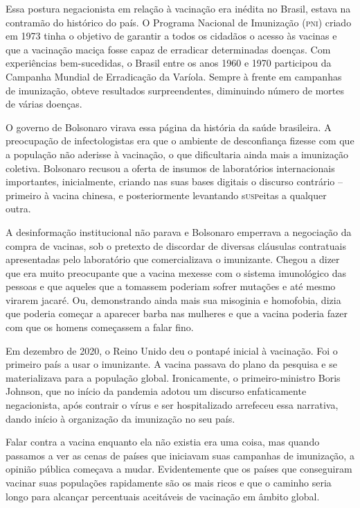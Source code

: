 Essa postura negacionista em relação à vacinação era inédita no Brasil,
estava na contramão do histórico do país. O Programa Nacional de
Imunização (\textsc{pni}) criado em 1973 tinha o objetivo de garantir a todos os
cidadãos o acesso às vacinas e que a vacinação maciça fosse capaz de
erradicar determinadas doenças. Com experiências bem-sucedidas, o Brasil
entre os anos 1960 e 1970 participou da Campanha Mundial de Erradicação
da Varíola. Sempre à frente em campanhas de imunização, obteve
resultados surpreendentes, diminuindo número de mortes de várias
doenças.

O governo de Bolsonaro virava essa página da história da saúde
brasileira. A preocupação de infectologistas era que o ambiente de
desconfiança fizesse com que a população não aderisse à vacinação, o que
dificultaria ainda mais a imunização coletiva. Bolsonaro recusou a
oferta de insumos de laboratórios internacionais importantes,
inicialmente, criando nas suas bases digitais o discurso contrário --
primeiro à vacina chinesa, e posteriormente levantando s\textsc{usp}eitas a
qualquer outra.

A desinformação institucional não parava e Bolsonaro emperrava a
negociação da compra de vacinas, sob o pretexto de discordar de diversas
cláusulas contratuais apresentadas pelo laboratório que comercializava o
imunizante. Chegou a dizer que era muito preocupante que a vacina
mexesse com o sistema imunológico das pessoas e que aqueles que a
tomassem poderiam sofrer mutações e até mesmo virarem jacaré. Ou,
demonstrando ainda mais sua misoginia e homofobia, dizia que poderia
começar a aparecer barba nas mulheres e que a vacina poderia fazer com
que os homens começassem a falar fino.

Em dezembro de 2020, o Reino Unido deu o pontapé inicial à vacinação.
Foi o primeiro país a usar o imunizante. A vacina passava do plano da
pesquisa e se materializava para a população global. Ironicamente, o
primeiro-ministro Boris Johnson, que no início da pandemia adotou um
discurso enfaticamente negacionista, após contrair o vírus e ser
hospitalizado arrefeceu essa narrativa, dando início à organização da
imunização no seu país.

Falar contra a vacina enquanto ela não existia era uma coisa, mas quando
passamos a ver as cenas de países que iniciavam suas campanhas de
imunização, a opinião pública começava a mudar. Evidentemente que os
países que conseguiram vacinar suas populações rapidamente são os mais
ricos e que o caminho seria longo para alcançar percentuais aceitáveis
de vacinação em âmbito global.

